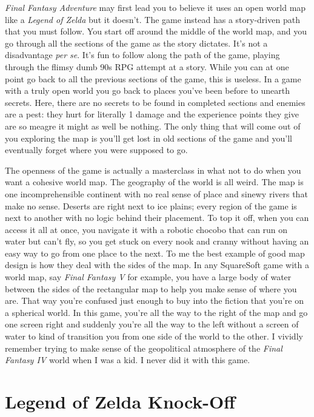 \documentclass{book}
\begin{document}
\emph{Final Fantasy Adventure} may first lead you to believe it uses an open world map like a \emph{Legend of Zelda} but it doesn’t. The game instead has a story-driven path that you must follow. You start off around the middle of the world map, and you go through all the sections of the game as the story dictates. It’s not a disadvantage \emph{per se}. It’s fun to follow along the path of the game, playing through the flimsy dumb 90s RPG attempt at a story. While you can at one point go back to all the previous sections of the game, this is useless. In a game with a truly open world you go back to places you’ve been before to unearth secrets. Here, there are no secrets to be found in completed sections and enemies are a pest: they hurt for literally 1 damage and the experience points they give are so meagre it might as well be nothing. The only thing that will come out of you exploring the map is you’ll get lost in old sections of the game and you’ll eventually forget where you were supposed to go.

The openness of the game is actually a masterclass in what not to do when you want a cohesive world map. The geography of the world is all weird. The map is one incomprehensible continent with no real sense of place and sinewy rivers that make no sense. Deserts are right next to ice plains; every region of the game is next to another with no logic behind their placement. To top it off, when you can access it all at once, you navigate it with a robotic chocobo that can run on water but can’t fly, so you get stuck on every nook and cranny without having an easy way to go from one place to the next. To me the best example of good map design is how they deal with the sides of the map. In any SquareSoft game with a world map, say \emph{Final Fantasy V} for example, you have a large body of water between the sides of the rectangular map to help you make sense of where you are. That way you’re confused just enough to buy into the fiction that you’re on a spherical world. In this game, you’re all the way to the right of the map and go one screen right and suddenly you’re all the way to the left without a screen of water to kind of transition you from one side of the world to the other. I vividly remember trying to make sense of the geopolitical atmosphere of the \emph{Final Fantasy IV} world when I was a kid. I never did it with this game.

\FloatBarrier\needspace{5pt}\section*{Legend of Zelda Knock-Off}\nopagebreak[4]
\end{document}
